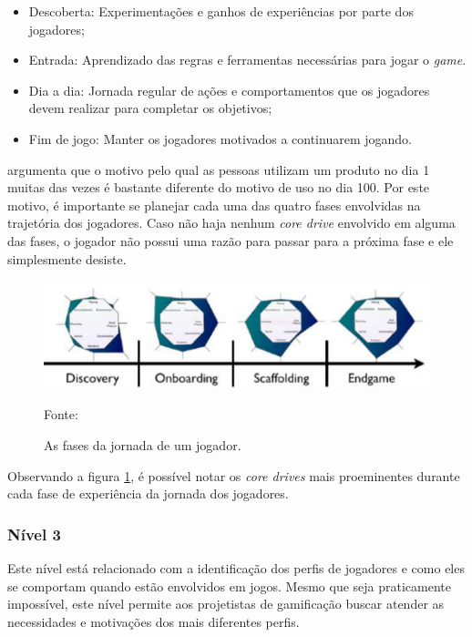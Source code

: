 \begin{itemize}
	\item Descoberta: Experimentações e ganhos de experiências por parte dos jogadores;
	\item Entrada: Aprendizado das regras e ferramentas necessárias para jogar o \textit{game}.
	\item Dia a dia: Jornada regular de ações e comportamentos que os jogadores devem realizar para completar os objetivos;
	\item Fim de jogo: Manter os jogadores motivados a continuarem jogando.
	
\end{itemize}

 argumenta que o motivo pelo qual as pessoas utilizam um produto no dia 1 muitas das vezes é bastante diferente do
motivo de uso no dia 100. Por este motivo, é importante se planejar cada uma das quatro fases envolvidas na trajetória dos jogadores. Caso não haja nenhum
\textit{core drive} envolvido em alguma das fases, o jogador não possui uma razão para passar para a próxima fase e ele simplesmente desiste.

\begin{figure}[h]
	\centering
	\includegraphics[keepaspectratio=true,scale=0.48]{figuras/fasesjornada.png}
	\caption{As fases da jornada de um jogador.}
	Fonte: \cite{chou2017actionable}
	\label{fasesjornada}
\end{figure}

Observando a figura \ref{fasesjornada}, é possível notar os \textit{core drives} mais proeminentes durante cada fase de experiência da jornada
dos jogadores.

\subsubsection{Nível 3}
Este nível está relacionado com a identificação dos perfis de jogadores e como eles se comportam quando estão envolvidos em jogos. Mesmo que seja
praticamente impossível, este nível permite aos projetistas de gamificação buscar atender as necessidades e motivações dos mais diferentes perfis.

